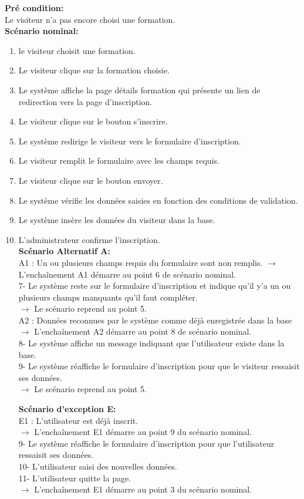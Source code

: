 \textbf{Pré condition:}\\
Le visiteur n'a pas encore choisi une formation.\\
\textbf{Scénario nominal:}
\begin{enumerate}
	\item le visiteur choisit une formation.
	\item Le visiteur clique sur la formation choisie. 
	\item Le système affiche la page détails formation qui présente un lien de redirection vers la page d'inscription.
	\item Le visiteur clique sur le bouton s'inscrire.
	\item Le système redirige le visiteur vers le formulaire d'inscription.
	\item Le visiteur remplit le formulaire avec les champs requis.
	\item Le visiteur clique sur le bouton envoyer.
	\item Le système vérifie les données saisies en fonction des conditions de validation.
	\item Le système insère les données du visiteur dans la base.
	\item L'administrateur confirme l'inscription.\\
	\textbf{Scénario Alternatif A:}\\
	A1 : Un ou plusieurs champs requis du formulaire sont non remplis.
	$\rightarrow$ L'enchaînement A1 démarre au point 6 de scénario nominal.\\
	7- Le système reste sur le formulaire d'inscription et indique qu'il y'a un ou plusieurs champs manquants qu'il faut compléter.\\
	$\rightarrow$ Le scénario reprend au point 5.\\
	A2 : Données reconnues par le système comme déjà enregistrée dans la base\\
	$\rightarrow$ L'enchaînement A2 démarre au point 8 de scénario nominal.\\
	8- Le système affiche un message indiquant que l'utilisateur existe dans la base.\\
	9- Le système réaffiche le formulaire d'inscription pour que le visiteur ressaisit ses données.\\
	$\rightarrow$ Le scénario reprend au point 5.
	
	\textbf{Scénario d'exception E:}\\
	E1 : L'utilisateur est déjà inscrit.\\
		$\rightarrow$ L'enchaînement E1 démarre au point 9 du scénario nominal.\\
	9- Le système réaffiche le formulaire d'inscription pour que l'utilisateur ressaisit ses données.\\
	10- L'utilisateur saisi des nouvelles données.\\ 
	11- L'utilisateur quitte la page.\\
	$\rightarrow$ L'enchaînement E1 démarre au point 3 du scénario nominal.\\
	

\end{enumerate}

